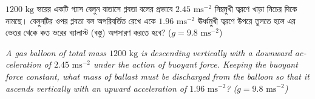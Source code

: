 \documentclass[12pt, a4paper]{article}
\begin{document}
\begin{tcolorbox}[questionbox={প্রশ্ন (Question) 1}]
    \noindent
    $1200\text{ kg}$ ভরের একটি গ্যাস বেলুন বাতাসে প্লবতা বলের প্রভাবে $2.45\text{ ms}^{-2}$ নিম্নমুখী ত্বরণে খাড়া নিচের দিকে নামছে। বেলুনটির ওপর প্লবতা বল অপরিবর্তিত রেখে একে $1.96\text{ ms}^{-2}$ ঊর্ধ্বমুখী ত্বরণে উপরে তুলতে হলে এর ভেতর থেকে কত ভরের ব্যালাস্ট (বস্তু) অপসারণ করতে হবে? ($g = 9.8\text{ ms}^{-2}$)
    
    \vspace{0.8em}
    \begin{english}
    \noindent\textit{\color{darkgray}
    A gas balloon of total mass $1200\text{ kg}$ is descending vertically with a downward acceleration of $2.45\text{ ms}^{-2}$ under the action of buoyant force. Keeping the buoyant force constant, what mass of ballast must be discharged from the balloon so that it ascends vertically with an upward acceleration of $1.96\text{ ms}^{-2}$? ($g = 9.8\text{ ms}^{-2}$)
    }
    \end{english}
\end{tcolorbox}
\end{document}
